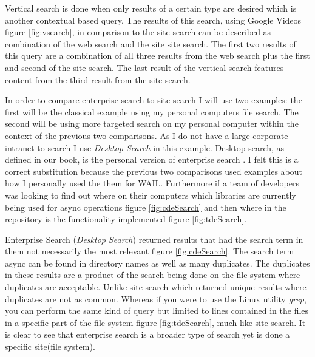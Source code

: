 \documentclass[a4paper,11pt]{article}
\begin{document}
Vertical search is done when only results of a certain type are desired which is another contextual based query. The results of this search, using Google Videos figure \hyperref[fig:vsearch]{\ref{fig:vsearch}}, in comparison to the site search can be described as combination of the web search and the site site search. The first two results of this query are a combination of all three results from the web search plus the first and second of the site search. The last result of the vertical search features content from the third result from the site search. 
\newline 

In order to compare enterprise search to site search I will use two examples: the first will be the classical example using my personal computers file search. The second will be using more targeted search on my personal computer within the context of the previous two comparisons. As I do not have a large corporate intranet to search I use \emph{Desktop Search} in this example. Desktop search, as defined in our book, is the personal version of enterprise search \citep[pp. 3]{CroftMetzlerStrohman200902}. I felt this is a correct substitution because the previous two comparisons used examples about how I personally used the them for WAIL. Furthermore if a team of developers was looking to find out where on their computers which libraries are currently being used for async operations figure \hyperref[fig:cdeSearch]{\ref{fig:cdeSearch}} and then where in the repository is the functionality implemented figure \hyperref[fig:tdeSearch]{\ref{fig:tdeSearch}}.

Enterprise Search (\emph{Desktop Search}) returned results that had the search term in them not necessarily the most relevant figure \hyperref[fig:cdeSearch]{\ref{fig:cdeSearch}}. The search term async can be found in directory names as well as many duplicates. The duplicates in these results are a product of the search being done on the file system where duplicates are acceptable. Unlike site search which returned unique results where duplicates are not as common. Whereas if you were to use the Linux utility \emph{grep}, you can perform the same kind of query but limited to lines contained in the files in a specific part of the file system figure \hyperref[fig:tdeSearch]{\ref{fig:tdeSearch}}, much like site search. It is clear to see that enterprise search is a broader type of search yet is done a specific site(file system).
\end{document}
